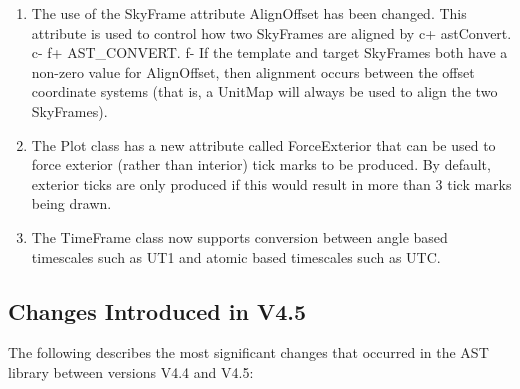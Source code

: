 \documentclass[twoside,11pt]{article}
\begin{document}
\begin{enumerate}
\item The use of the SkyFrame attribute AlignOffset has been changed. This
attribute is used to control how two SkyFrames are aligned by 
c+
astConvert.
c-
f+
AST\_CONVERT.
f-
If the template and target SkyFrames both have a non-zero value for 
AlignOffset, then alignment occurs between the offset coordinate systems 
(that is, a UnitMap will always be used to align the two SkyFrames).

\item The Plot class has a new attribute called ForceExterior that can be
used to force exterior (rather than interior) tick marks to be produced.
By default, exterior ticks are only produced if this would result in 
more than 3 tick marks being drawn.

\item The TimeFrame class now supports conversion between angle based
timescales such as UT1 and atomic based timescales such as UTC.

\end{enumerate}

\subsection{Changes Introduced in V4.5}

The following describes the most significant changes that
occurred in the AST library between versions V4.4 and V4.5:
\end{document}
